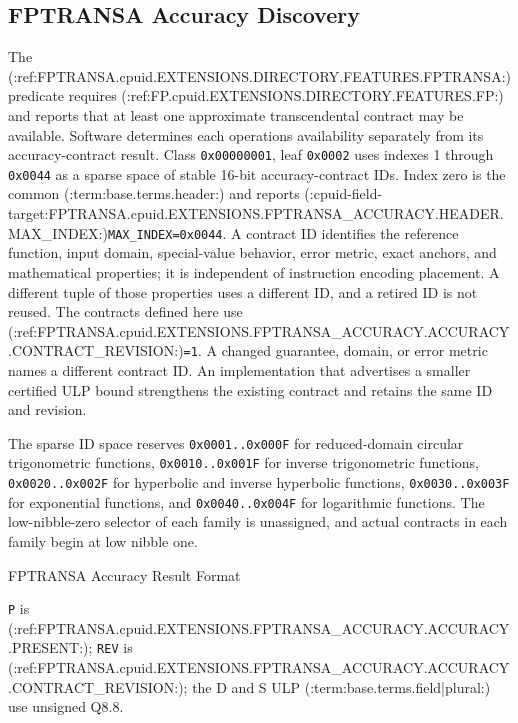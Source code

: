 \subsection{FPTRANSA Accuracy Discovery}
The (:ref:FPTRANSA.cpuid.EXTENSIONS.DIRECTORY.FEATURES.FPTRANSA:) predicate requires (:ref:FP.cpuid.EXTENSIONS.DIRECTORY.FEATURES.FP:) and reports that at least one approximate transcendental
contract may be available. Software determines each operation\textquotesingle{}s availability separately from its
accuracy-contract result.
Class \texttt{0x00000001}, leaf \texttt{0x0002} uses indexes 1 through \texttt{0x0044} as a sparse space of stable
16-bit accuracy-contract IDs. Index zero is the common (:term:base.terms.header:) and reports (:cpuid-field-target:FPTRANSA.cpuid.EXTENSIONS.FPTRANSA_ACCURACY.HEADER.MAX_INDEX:)\texttt{MAX\_INDEX}\texttt{=0x0044}.
A contract ID identifies the reference function, input domain, special-value behavior, error metric, exact anchors,
and mathematical properties; it is independent of instruction encoding placement. A different tuple of those
properties uses a different ID, and a retired ID is not reused. The contracts defined here use
(:ref:FPTRANSA.cpuid.EXTENSIONS.FPTRANSA_ACCURACY.ACCURACY.CONTRACT_REVISION:)\texttt{=1}. A changed guarantee, domain, or error metric names a different contract ID.
An implementation that advertises a smaller certified ULP bound strengthens the existing contract and retains the
same ID and revision.

The sparse ID space reserves \texttt{0x0001..0x000F} for reduced-domain circular trigonometric functions,
\texttt{0x0010..0x001F} for inverse trigonometric functions, \texttt{0x0020..0x002F} for hyperbolic and inverse
hyperbolic functions, \texttt{0x0030..0x003F} for exponential functions, and
\texttt{0x0040..0x004F} for logarithmic functions. The low-nibble-zero selector of each family is unassigned, and
actual contracts in each family begin at low nibble one.

\begin{BedrockListedFormatDiagram}{FPTRANSA Accuracy Result Format}
\end{BedrockListedFormatDiagram}
{\small
\texttt{P} is (:ref:FPTRANSA.cpuid.EXTENSIONS.FPTRANSA_ACCURACY.ACCURACY.PRESENT:); \texttt{REV} is (:ref:FPTRANSA.cpuid.EXTENSIONS.FPTRANSA_ACCURACY.ACCURACY.CONTRACT_REVISION:); the D and S ULP
(:term:base.terms.field|plural:) use unsigned Q8.8.
\par}

